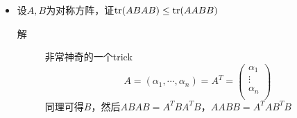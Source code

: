 \begin{itemize}
\item 设$A,B$为对称方阵，证$\operatorname{tr}(ABAB)\leq \operatorname{tr}(AABB)$
\begin{description}
\item[解] 非常神奇的一个trick
\[
A=(\alpha_1,\cdots,\alpha_n) = A^T = \left(\begin{array}{c}
\alpha_1\\
\vdots\\
\alpha_n\\
\end{array}
\right)
\]
同理可得$B$，然后$ABAB=A^TBA^TB$，$AABB=A^TAB^TB$
\end{description}





















\end{itemize}